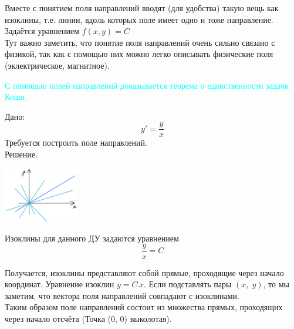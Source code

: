 \begin{figure}[h!]
    \noindent{}
\end{figure}

Вместе с понятием поля направлений вводят (для удобства) такую вещь как изоклины, т.е. линии, вдоль которых поле имеет одно и тоже направление. Задаётся уравнением $f(x, y) = C$\\

Тут важно заметить, что понятие поля направлений очень сильно связано с физикой, так как с помощью них можно легко описывать физические поля (эклектрическое, магнитное).

\textcolor{cyan}{С помощью полей направлений доказывается теорема о единственности задачи Коши.}

\begin{Example}
    Дано: 
    \[
        y' = \frac{y}{x}
    \]
    Требуется построить поле направлений.\\
    Решение.\\
    \begin{floatingfigure}[2]{34mm}
        \noindent
        \hfil
        \includegraphics[height=24mm]{pictures/2_1_4.png}
        \hfil
    \end{floatingfigure}
    Изоклины для данного ДУ задаются уравнением 
    \[
        \frac{y}{x} = C
    \]
    
    Получается, изоклины представляют собой прямые, проходящие через начало координат. Уравнение изоклин $y = C\,x$. Если подставлять пары $(x,\; y)$, то мы заметим, что вектора поля направлений совпадают с изоклинами.\\
    Таким образом поле направлений состоит из множества прямых, проходящих через начало отсчёта (Точка (0, 0) выколотая).
\end{Example}

